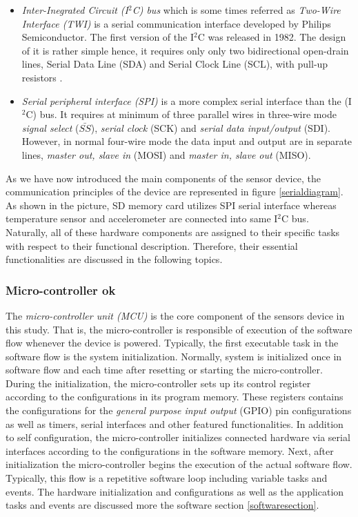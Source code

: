 \documentclass[english,12pt,a4paper,pdftex,elec,utf8]{aaltothesis}
\begin{document}
\begin{itemize}
\item \textit{Inter-Inegrated Circuit (I$^2$C) bus} which is some times referred as \textit{Two-Wire Interface (TWI)} is a serial communication interface developed by Philips Semiconductor. The first version of  the I$^2$C was released in 1982. The design of it is rather simple hence, it requires only only two bidirectional open-drain lines, Serial Data Line (SDA) and Serial Clock Line (SCL), with pull-up resistors \cite{i2cmanual}.


\item \textit{Serial peripheral interface (SPI)} \cite{spimanual} is a more complex serial interface than the (I$^2$C) bus. It requires at minimum of three parallel wires in three-wire mode \cite{bma222datasheet} \textit{signal select} ($\bar{SS}$), \textit{serial clock} (SCK) and \textit{serial data input/output} (SDI). However, in normal four-wire mode the data input and output are in separate lines, \textit{master out, slave in} (MOSI) and \textit{master in, slave out} (MISO).
\end{itemize}  As we have now introduced the main components of the sensor device, the communication principles of the device are represented in figure \ref{serialdiagram}. As shown in the picture, SD memory card utilizes SPI serial interface whereas temperature sensor and accelerometer are connected into same I$^2$C bus. Naturally, all of these hardware components are assigned to their specific tasks with respect to their functional description. Therefore, their essential functionalities are discussed in the following topics.



\subsubsection*{Micro-controller ok}

The \textit{micro-controller unit (MCU)} is the core component of the sensors device in this study. That is, the micro-controller is responsible of execution of the software flow whenever the device is powered. Typically, the first executable task in the software flow is the system initialization. Normally, system is initialized once in software flow and each time after resetting or starting the micro-controller. During the initialization, the micro-controller sets up its control register according to the configurations in its program memory. These registers contains the configurations for the \textit{general purpose input output} (GPIO) pin configurations as well as timers, serial interfaces and other featured functionalities. In addition to self configuration, the micro-controller initializes connected hardware via serial interfaces according to the configurations in the software memory. Next, after initialization the micro-controller begins the execution of the actual software flow. Typically, this flow is a repetitive software loop including variable tasks and events. The hardware initialization and configurations as well as the application tasks and events are discussed more the software section \ref{softwaresection}.
\end{document}
